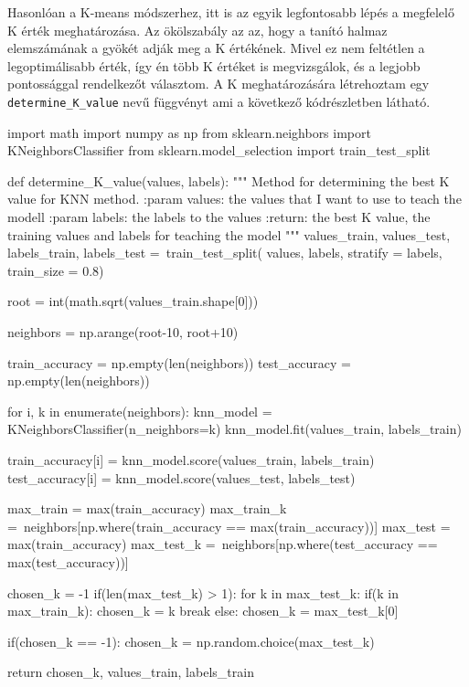 Hasonlóan a K-means módszerhez, itt is az egyik legfontosabb lépés a megfelelő K érték meghatározása. Az ökölszabály az az, hogy a tanító halmaz elemszámának a gyökét adják meg a K értékének. Mivel ez nem feltétlen a legoptimálisabb érték, így én több K értéket is megvizsgálok, és a legjobb pontossággal rendelkezőt választom. A K meghatározására létrehoztam egy \texttt{determine\_K\_value} nevű függvényt ami a következő kódrészletben látható.
\begin{python}
import math
import numpy as np
from sklearn.neighbors import KNeighborsClassifier
from sklearn.model_selection import train_test_split

def determine_K_value(values, labels):
    """
    Method for determining the best K value for KNN method.
    :param values: the values that I want to use to teach the modell
    :param labels: the labels to the values
    :return: the best K value, the training values and labels 
        for teaching the model
    """
    values_train, values_test, labels_train, labels_test =\
        train_test_split(
            values,
            labels,
            stratify = labels,
            train_size = 0.8)

    root =  int(math.sqrt(values_train.shape[0]))

    neighbors = np.arange(root-10, root+10)

    train_accuracy = np.empty(len(neighbors))
    test_accuracy = np.empty(len(neighbors))

    for i, k in enumerate(neighbors):
        knn_model = KNeighborsClassifier(n_neighbors=k)
        knn_model.fit(values_train, labels_train)

        train_accuracy[i] = knn_model.score(values_train, labels_train)
        test_accuracy[i] = knn_model.score(values_test, labels_test)

    max_train = max(train_accuracy)
    max_train_k =\
        neighbors[np.where(train_accuracy == max(train_accuracy))]
    max_test = max(train_accuracy)
    max_test_k =\
        neighbors[np.where(test_accuracy == max(test_accuracy))]

    chosen_k = -1
    if(len(max_test_k) > 1):
        for k in max_test_k:
            if(k in max_train_k):
                chosen_k = k
                break
    else:
        chosen_k = max_test_k[0]

    if(chosen_k == -1):
        chosen_k = np.random.choice(max_test_k)

    return chosen_k, values_train, labels_train
\end{python}

